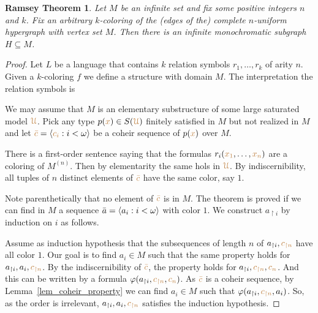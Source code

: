 \documentclass[creche.tex]{subfiles}
\begin{document}
\theoremstyle{mio}
\newtheorem{Ramsey}[thm]{Ramsey Theorem}
\begin{Ramsey}\label{thm_Ramsey}
Let $M$ be an infinite set and fix some positive integers $n$ and $k$.
Fix an arbitrary $k$-coloring of the (edges of the) complete $n$-uniform hypergraph with vertex set $M$.
Then there is an infinite monochromatic subgraph $H\subseteq M$.
\end{Ramsey}
\begin{proof}
Let $L$ be a language that contains $k$ relation symbols $r_1,\dots,r_k$ of arity $n$.
Given a $k$-coloring $f$ we define a structure with domain $M$.
The interpretation the relation symbols is




We may assume that $M$ is an elementary substructure of some large saturated model ${\color{brown}\EuScript U}$.
Pick any type $p({\color{brown} x})\in S({\color{brown}\EuScript U})$ finitely satisfied in $M$ but not realized in $M$ and let ${\color{brown}\bar c}=\langle{\color{brown}c_i}:i<\omega\rangle$ be a coheir sequence of $p({\color{brown} x})$ over $M$.

There is a first-order sentence saying that the formulas $r_i({\color{brown} x_1},\dots,{\color{brown} x_n})$ are a coloring of $M^{(n)}$.
Then by elementarity the same hols in ${\color{brown}\EuScript U}$.
By indiscernibility,
all tuples of $n$ distinct elements of ${\color{brown}\bar c}$ have the same color, say $1$.


Note parenthetically that no element of ${\color{brown}\bar c}$ is in $M$.
The theorem is proved if we can find in $M$ a sequence $\bar a=\langle a_i:i<\omega\rangle$ with color $1$.
We construct $a_{\restriction i}$ by induction on $i$ as follows.

Assume as induction hypothesis that the subsequences of length $n$ of $a_{\restriction i},{\color{brown} c_{\restriction n}}$ have all color $1$.
Our goal is to find $a_i\in M$ such that the same property holds for $a_{\restriction i},a_i,{\color{brown} c_{\restriction n}}$.
By the indiscernibility of ${\color{brown}\bar c}$,
the property holds for  $a_{\restriction i},{\color{brown} c_{\restriction n}},{\color{brown}{c_n}}$.
And this can be written by a formula $\varphi(a_{\restriction i},{\color{brown} c_{\restriction n}},{\color{brown}{c_n}})$.
As ${\color{brown}\bar c}$ is a coheir sequence,
by Lemma~\ref{lem_coheir_property} we can find  $a_i\in M$ such that  $\varphi(a_{\restriction i},{\color{brown} c_{\restriction n}},a_i)$.
So,
as the order is irrelevant,
$a_{\restriction i},a_i,{\color{brown} c_{\restriction n}}$ satisfies the induction hypothesis.
\end{proof}
\end{document}
